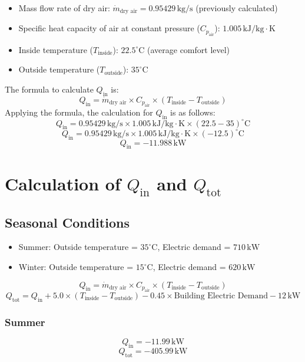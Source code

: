 \documentclass{article}
\begin{document}
\begin{itemize}
    \item Mass flow rate of dry air: \( \dot{m}_{\text{dry air}} = 0.95429 \, \text{kg/s} \) (previously calculated)
    \item Specific heat capacity of air at constant pressure (\( C_{p_{\text{air}}} \)): \( 1.005 \, \text{kJ/kg} \cdot \text{K} \)
    \item Inside temperature (\( T_{\text{inside}} \)): \( 22.5^\circ\text{C} \) (average comfort level)
    \item Outside temperature (\( T_{\text{outside}} \)): \( 35^\circ\text{C} \)
\end{itemize}
\noindent
The formula to calculate \( Q_{\text{in}} \) is:
\[ Q_{\text{in}} = \dot{m}_{\text{dry air}} \times C_{p_{\text{air}}} \times (T_{\text{inside}} - T_{\text{outside}}) \]
\noindent
Applying the formula, the calculation for \( Q_{\text{in}} \) is as follows:
\[ Q_{\text{in}} = 0.95429 \, \text{kg/s} \times 1.005 \, \text{kJ/kg} \cdot \text{K} \times (22.5 - 35)^\circ\text{C} \]
\[ Q_{\text{in}} = 0.95429 \, \text{kg/s} \times 1.005 \, \text{kJ/kg} \cdot \text{K} \times (-12.5)^\circ\text{C} \]
\[ Q_{\text{in}} = -11.988 \, \text{kW} \]

\section{Calculation of \( Q_{\text{in}} \) and \( Q_{\text{tot}} \)}

\subsection*{Seasonal Conditions}
\begin{itemize}
    \item Summer: Outside temperature = \( 35^\circ\text{C} \), Electric demand = \( 710 \, \text{kW} \)
    \item Winter: Outside temperature = \( 15^\circ\text{C} \), Electric demand = \( 620 \, \text{kW} \)
\end{itemize}

\[ Q_{\text{in}} = \dot{m}_{\text{dry air}} \times C_{p_{\text{air}}} \times (T_{\text{inside}} - T_{\text{outside}}) \]
\[ Q_{\text{tot}} = Q_{\text{in}} + 5.0 \times (T_{\text{inside}} - T_{\text{outside}}) - 0.45 \times \text{Building Electric Demand} - 12 \, \text{kW} \]

\subsubsection*{Summer}
\[ Q_{\text{in}} = -11.99 \, \text{kW} \]
\[ Q_{\text{tot}} = -405.99 \, \text{kW} \]
\end{document}
